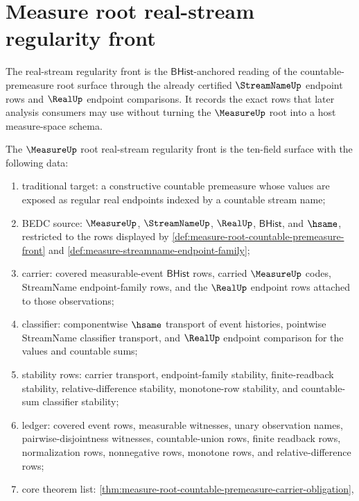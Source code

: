 \section{Measure root real-stream regularity front}
\label{sec:measure-root-real-stream-regularity-front}

The real-stream regularity front is the $\mathsf{BHist}$-anchored reading of
the countable-premeasure root surface through the already certified
$\StreamNameUp$ endpoint rows and $\RealUp$ endpoint comparisons. It records
the exact rows that later analysis consumers may use without turning the
$\MeasureUp$ root into a host measure-space schema.

\begin{definition}
\label{def:measure-root-real-stream-regularity-front}
The $\MeasureUp$ root real-stream regularity front is the ten-field surface
with the following data:
\begin{enumerate}
  \item traditional target: a constructive countable premeasure whose values
  are exposed as regular real endpoints indexed by a countable stream name;
  \item BEDC source: $\MeasureUp$, $\StreamNameUp$, $\RealUp$,
  $\mathsf{BHist}$, and $\hsame$, restricted to the rows displayed by
  \autoref{def:measure-root-countable-premeasure-front} and
  \autoref{def:measure-streamname-endpoint-family};
  \item carrier: covered measurable-event $\mathsf{BHist}$ rows, carried
  $\MeasureUp$ codes, StreamName endpoint-family rows, and the $\RealUp$
  endpoint rows attached to those observations;
  \item classifier: componentwise $\hsame$ transport of event histories,
  pointwise StreamName classifier transport, and $\RealUp$ endpoint comparison
  for the values and countable sums;
  \item stability rows: carrier transport, endpoint-family stability,
  finite-readback stability, relative-difference stability, monotone-row
  stability, and countable-sum classifier stability;
  \item ledger: covered event rows, measurable witnesses, unary observation
  names, pairwise-disjointness witnesses, countable-union rows, finite
  readback rows, normalization rows, nonnegative rows, monotone rows, and
  relative-difference rows;
  \item core theorem list:
  \autoref{thm:measure-root-countable-premeasure-carrier-obligation},

\end{enumerate}
\end{definition}
